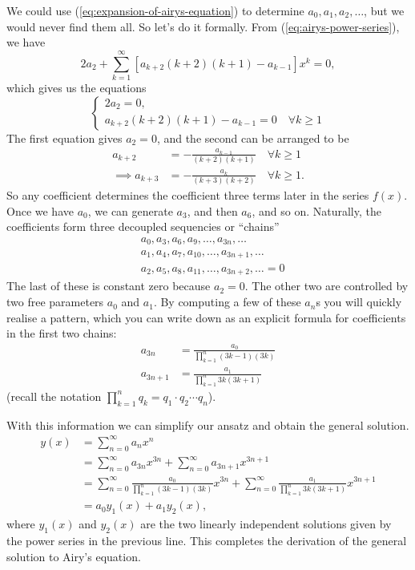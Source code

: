\documentclass[11pt, letterpaper, oneside]{article}     %
\numberwithin{equation}{subsection}
\theoremstyle{definition}
\numberwithin{theorem}{section}
\theoremstyle{remark}
\begin{document}
\begin{enumerate}
  We could use (\ref{eq:expansion-of-airys-equation}) to determine $a_0,a_1,a_2,\dots$, but we would never find them all. So let's do it formally. From (\ref{eq:airys-power-series}), we have
  \begin{equation}
    2a_2 + \sum_{k=1}^\infty \left[a_{k+2}(k+2)(k+1) - a_{k-1}\right]x^k = 0,
  \end{equation}
  which gives us the equations
  \begin{equation}
    \begin{cases}
      2a_2 = 0,\\
      a_{k+2}(k+2)(k+1) - a_{k-1} = 0\quad\forall k\geq 1
    \end{cases}
  \end{equation}
  The first equation gives $a_2 = 0$, and the second can be arranged to be
  \begin{align}
    a_{k+2} &=  - \frac{a_{k-1}}{(k+2)(k+1)}\quad\forall k\geq 1\\
    \implies a_{k+3} &=  - \frac{a_k}{(k+3)(k+2)}\quad\forall k\geq 1.
  \end{align}
  So any coefficient determines the coefficient three terms later in the series $f(x)$. Once we have $a_0$, we can generate $a_3$, and then $a_6$, and so on. Naturally, the coefficients form three decoupled sequencies or ``chains''
  \begin{align}
    &a_0,a_3,a_6,a_9,\dots,a_{3n},\dots\\
    &a_1,a_4,a_7,a_{10},\dots,a_{3n+1},\dots\\
    &a_2,a_5,a_8,a_{11},\dots,a_{3n+2},\dots = 0
  \end{align}
  The last of these is constant zero because $a_2 = 0$. The other two are controlled by two free parameters $a_0$ and $a_1$. By computing a few of these $a_n$s you will quickly realise a pattern, which you can write down as an explicit formula for coefficients in the first two chains:
  \begin{align}
    a_{3n} &= \frac{a_0}{\prod_{k=1}^n(3k-1)(3k)}\\
    a_{3n+1} &= \frac{a_1}{\prod_{k=1}^n3k(3k+1)}
  \end{align}
  (recall the notation $\prod_{k=1}^n q_k = q_1\cdot q_2\cdots q_n$).

  With this information we can simplify our ansatz and obtain the general solution.
  \begin{align}
    y(x) &= \sum_{n=0}^\infty a_nx^{n}\\
    &= \sum_{n=0}^\infty a_{3n}x^{3n} + \sum_{n=0}^\infty a_{3n+1}x^{3n+1}\\
    &= \sum_{n=0}^\infty \frac{a_0}{\prod_{k=1}^n(3k-1)(3k)}x^{3n} + \sum_{n=0}^\infty \frac{a_1}{\prod_{k=1}^n3k(3k+1)}x^{3n+1}\\
    &= a_0y_1(x) + a_1y_2(x),
  \end{align}
  where $y_1(x)$ and $y_2(x)$ are the two linearly independent solutions given by the power series in the previous line. This completes the derivation of the general solution to Airy's equation.


\end{enumerate}
\end{document}
